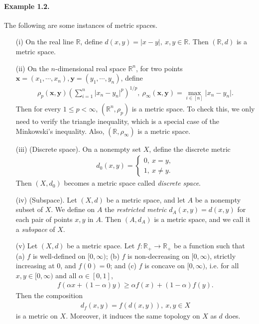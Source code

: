 \documentclass{article}
\begin{document}
\paragraph{Example 1.2.\label{example:1.2}} The following are some instances of metric spaces.
\vspace{0.1cm}
\begin{itemize}
	\item[(i)] On the real line $\mathbb{R}$, define $d(x,y)=\vert x-y\vert,\ x,y\in\mathbb{R}$. Then $(\mathbb{R},d)$ is a metric space.
	\vspace{0.1cm}
	\item[(ii)] On the $n$-dimensional real space $\mathbb{R}^n$, for two points $\mathbf{x}=(x_1,\cdots,x_n),\mathbf{y}=(y_1,\cdots,y_n)$, define
	\begin{align*}
		\rho_p(\mathbf{x},\mathbf{y}) \left(\sum_{i=1}^n \vert x_n-y_n\vert^p\right)^{1/p},\ 
		\rho_\infty(\mathbf{x},\mathbf{y}) = \max_{i\in[n]} \vert x_n-y_n\vert.
	\end{align*}
    Then for every $1\leq p<\infty$, $(\mathbb{R}^n,\rho_p)$ is a metric space. To check this, we only need to verify the triangle inequality, which is a special case of the Minkowski's inequality.
    Also, $(\mathbb{R},\rho_\infty)$ is a metric space.
    \vspace{0.1cm}
    \item[(iii)] (Discrete space). On a nonempty set $X$, define the discrete metric
    \begin{align*}
    	d_0(x,y)=\begin{cases}
    		0,\ x=y,\\
    		1,\ x\neq y.
    	\end{cases}
    \end{align*}
    Then $(X,d_0)$ becomes a metric space called \textit{discrete space}.
    \vspace{0.1cm}
    \item[(iv)] (Subspace). Let $(X,d)$ be a metric space, and let $A$ be a nonempty subset of $X$. We define on $A$ the \textit{restricted metric} $d_A(x,y)=d(x,y)$ for each pair of points $x,y$ in $A$. Then $(A,d_A)$ is a metric space, and we call it a \textit{subspace} of $X$.
    \vspace{0.1cm}
    \item[(v)] Let $(X,d)$ be a metric space. Let $f:\mathbb{R}_+\to\mathbb{R}_+$ be a function such that (a) $f$ is well-defined on $[0,\infty)$; (b) $f$ is non-decreasing on $[0,\infty)$, strictly increasing at $0$, and $f(0)=0$; and (c) $f$ is concave on $[0,\infty)$, i.e. for all $x,y\in[0,\infty)$ and all $\alpha\in[0,1]$,
    \begin{align*}
    	f(\alpha x+(1-\alpha)y)\geq \alpha f(x) + (1-\alpha)f(y).\tag{1.1}\label{eq:1.1}
    \end{align*}
    Then the composition
    \begin{align*}
    	d_f(x,y)=f\left(d(x,y)\right),\ x,y\in X
    \end{align*}
    is a metric on $X$. Moreover, it induces the same topology on $X$ as $d$ does.
    

\end{itemize}
\end{document}
